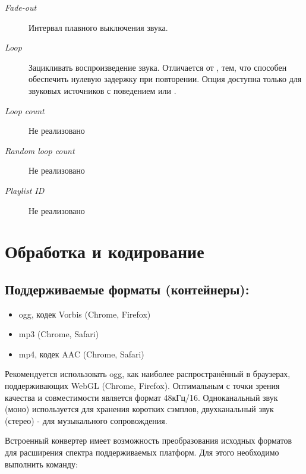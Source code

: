 \documentclass[a4paper,12pt,oneside]{sphinxmanual}
\begin{document}
\begin{description}
\item[{\emph{Fade-out}}] \leavevmode
Интервал плавного выключения звука.

\item[{\emph{Loop}}] \leavevmode
Зацикливать воспроизведение звука. Отличается от ,
тем, что способен обеспечить нулевую задержку при повторении. Опция доступна
только для звуковых источников с поведением  или .

\item[{\emph{Loop count}}] \leavevmode
Не реализовано

\item[{\emph{Random loop count}}] \leavevmode
Не реализовано

\item[{\emph{Playlist ID}}] \leavevmode
Не реализовано

\end{description}


\section{Обработка и кодирование}
\label{audio:id3}\label{audio:encoding}

\subsection{Поддерживаемые форматы (контейнеры):}
\label{audio:id4}\begin{itemize}
\item {} 
ogg, кодек Vorbis (Chrome, Firefox)

\item {} 
mp3 (Chrome, Safari)

\item {} 
mp4, кодек AAC (Chrome, Safari)

\end{itemize}

Рекомендуется использовать ogg, как наиболее распространённый в браузерах,
поддерживающих WebGL (Chrome, Firefox). Оптимальным с точки зрения качества и
совместимости является формат 48кГц/16. Одноканальный звук (моно) используется
для хранения коротких сэмплов, двухканальный звук (стерео) - для музыкального
сопровождения.

Встроенный конвертер имеет возможность преобразования исходных форматов для
расширения спектра поддерживаемых платформ. Для этого необходимо выполнить
команду:
\end{document}
